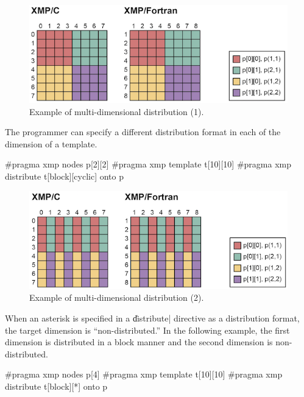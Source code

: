 \begin{figure}
  \centering
  \includegraphics{figs/multi.png}
  \caption{Example of multi-dimensional distribution (1).}
\end{figure}

The programmer can specify a different distribution format in each of
the dimension of a template.

\begin{XCexample}
#pragma xmp nodes p[2][2]
#pragma xmp template t[10][10]
#pragma xmp distribute t[block][cyclic] onto p
\end{XCexample}


\begin{figure}
  \centering
  \includegraphics{figs/multi2.png}
  \caption{Example of multi-dimensional distribution (2).}
\end{figure}

When an asterisk is specified in a \|distribute| directive as
a distribution format, the target dimension is ``non-distributed.'' In
the following example, the first dimension is distributed in a
block manner and the second dimension is non-distributed.

\begin{XCexample}
#pragma xmp nodes p[4]
#pragma xmp template t[10][10]
#pragma xmp distribute t[block][*] onto p
\end{XCexample}

